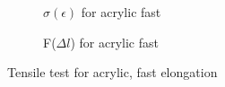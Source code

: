 \documentclass{scrartcl}
\begin{document}
\begin{figure}[!ht]
    \centering
    \begin{subfigure}{0.49\textwidth}
        \caption{$\sigma(\epsilon)$ for acrylic fast}
        \label{fig:tensileAcrylicFastSigma}
    \end{subfigure}
    \begin{subfigure}{0.49\textwidth}
        \caption{F($\Delta l$) for acrylic fast}
        \label{fig:tensileAcrylicFastForce}
    \end{subfigure}
    \caption{Tensile test for acrylic, fast elongation}
    \label{fig:tensileAcrylicFast}
\end{figure}
\end{document}
